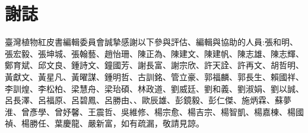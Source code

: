 \chapter{謝誌}

\linespread{1.5}\selectfont
\normalfont\selectfont
臺灣植物紅皮書編輯委員會誠摯感謝以下參與評估、編輯與協助的人員:張和明、張宏毅、張坤城、張翰藝、趙怡珊、陳正為、陳建文、陳建帆、陳志雄、陳志輝、鄭育斌、邱文良、鍾詩文、鐘國芳、謝長富、謝宗欣、許天詮、許再文、胡哲明、黃獻文、黃星凡、黃曜謀、鍾明哲、古訓銘、管立豪、郭福麟、郭長生、賴國祥、李訓煌、李松柏、梁慧舟、梁珆碩、林政道、劉威廷、劉和義、劉淑娟、劉以誠、呂長澤、呂福原、呂碧鳳、呂勝由、、歐辰雄、彭鏡毅、彭仁傑、施炳霖、蘇夢淮、曾彥學、曾妤馨、王震哲、吳維修、楊宗愈、楊吉宗、楊智凱、楊嘉棟、楊國禎、楊勝任、葉慶龍、嚴新富，如有疏漏，敬請見諒。\\

\linespread{1}\selectfont
